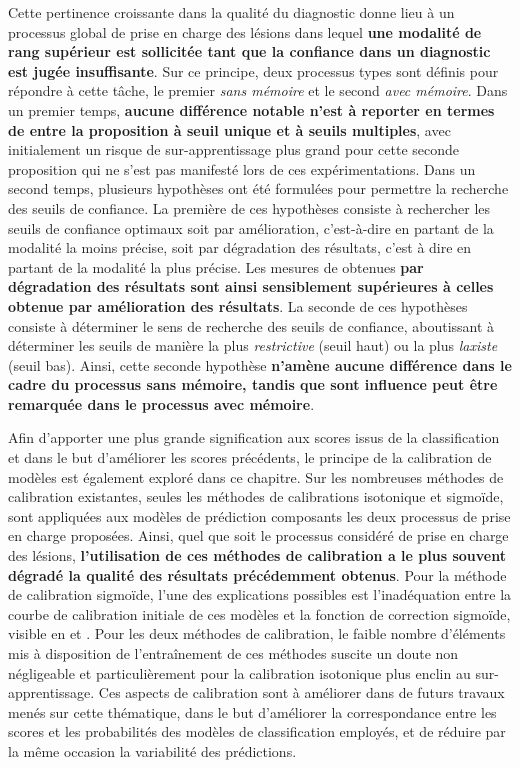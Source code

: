 Cette pertinence croissante dans la qualité du diagnostic donne lieu à un processus global de prise en charge des lésions dans lequel \textbf{une modalité de rang supérieur est sollicitée tant que la confiance dans un diagnostic est jugée insuffisante}. Sur ce principe, deux processus types sont définis pour répondre à cette tâche, le premier \textit{sans mémoire} et le second \textit{avec mémoire}. Dans un premier temps, \textbf{aucune différence notable n'est à reporter en termes de \fscore{} entre la proposition à seuil unique et à seuils multiples}, avec initialement un risque de sur-apprentissage plus grand pour cette seconde proposition qui ne s'est pas manifesté lors de ces expérimentations. Dans un second temps, plusieurs hypothèses ont été formulées pour permettre la recherche des seuils de confiance. La première de ces hypothèses consiste à rechercher les seuils de confiance optimaux soit par amélioration, c'est-à-dire en partant de la modalité la moins précise, soit par dégradation des résultats, c'est à dire en partant de la modalité la plus précise. Les mesures de \fscore{} obtenues \textbf{par dégradation des résultats sont ainsi sensiblement supérieures à celles obtenue par amélioration des résultats}. La seconde de ces hypothèses consiste à déterminer le sens de recherche des seuils de confiance, aboutissant à déterminer les seuils de manière la plus \textit{restrictive} (seuil haut) ou la plus \textit{laxiste} (seuil bas). Ainsi, cette seconde hypothèse \textbf{n'amène aucune différence dans le cadre du processus sans mémoire, tandis que sont influence peut être remarquée dans le processus avec mémoire}.\par

Afin d'apporter une plus grande signification aux scores issus de la classification et dans le but d'améliorer les scores précédents, le principe de la calibration de modèles est également exploré dans ce chapitre. Sur les nombreuses méthodes de calibration existantes, seules les méthodes de calibrations isotonique et sigmoïde, sont appliquées aux modèles de prédiction composants les deux processus de prise en charge proposées. Ainsi, quel que soit le processus considéré de prise en charge des lésions, \textbf{l'utilisation de ces méthodes de calibration a le plus souvent dégradé la qualité des résultats précédemment obtenus}. Pour la méthode de calibration sigmoïde, l'une des explications possibles est l'inadéquation entre la courbe de calibration initiale de ces modèles et la fonction de correction sigmoïde, visible en  et . Pour les deux méthodes de calibration, le faible nombre d'éléments mis à disposition de l'entraînement de ces méthodes suscite un doute non négligeable et particulièrement pour la calibration isotonique plus enclin au sur-apprentissage. Ces aspects de calibration sont à améliorer dans de futurs travaux menés sur cette thématique, dans le but d'améliorer la correspondance entre les scores et les probabilités des modèles de classification employés, et de réduire par la même occasion la variabilité des prédictions.\par
\clearpage

